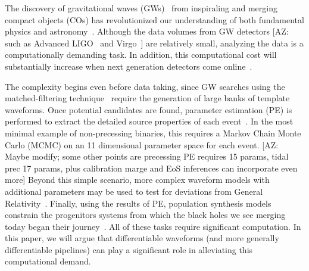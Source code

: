 \documentclass[twocolumn]{aastex631}
\newcommand{\AZ}[1]{{\color{Burnt}[AZ: #1]}}
\begin{document}
The discovery of gravitational waves (GWs)~\citep{LIGOScientific:2016aoc} from inspiraling and merging compact objects (COs) has revolutionized our understanding of both fundamental physics and astronomy~\citep[e.g.][]{LIGOScientific:2021djp,LIGOScientific:2021sio,LIGOScientific:2021psn}.
Although the data volumes from GW detectors 
\AZ{such as Advanced LIGO~\citep{LIGOScientific:2014pky} and Virgo~\citep{VIRGO:2014yos}} 
are relatively small, analyzing the data is a computationally demanding task.
In addition, this computational cost will substantially increase when next generation detectors come online~\citep{Maggiore:2019uih, Reitze:2019iox, Evans:2021gyd}.

The complexity begins even before data taking, since GW searches using the matched-filtering technique~\citep{Owen:1998dk, Owen:1995tm} require the generation of large banks of template waveforms.
Once potential candidates are found, parameter estimation (PE) is performed to extract the detailed source properties of each event~\citep{Christensen:2022bxb, 2020MNRAS.493.3132S, Ashton:2018jfp, Romero-Shaw:2020owr, Veitch:2014wba, Biwer:2018osg}.
In the most minimal example of non-precessing binaries, this requires a Markov Chain Monte Carlo (MCMC) on an 11 dimensional parameter space for each event.
\AZ{Maybe modify; some other points are precessing PE requires 15 params, tidal prec 17 params, plus calibration marge and EoS inferences can incorporate even more}
Beyond this simple scenario, more complex waveform models with additional parameters may be used to test for deviations from General Relativity~\citep{Krishnendu:2021fga, LIGOScientific:2020tif, LIGOScientific:2016lio, Yunes:2016jcc, Arun:2006yw, Agathos:2013upa}.
Finally, using the results of PE, population synthesis models constrain the progenitors systems from which the black holes we see merging today began their journey~\citep{LIGOScientific:2020kqk, LIGOScientific:2021psn, Wong:2022flg}.
All of these tasks require significant computation.
In this paper, we will argue that differentiable waveforms (and more generally differentiable pipelines) can play a significant role in alleviating this computational demand.
\end{document}
